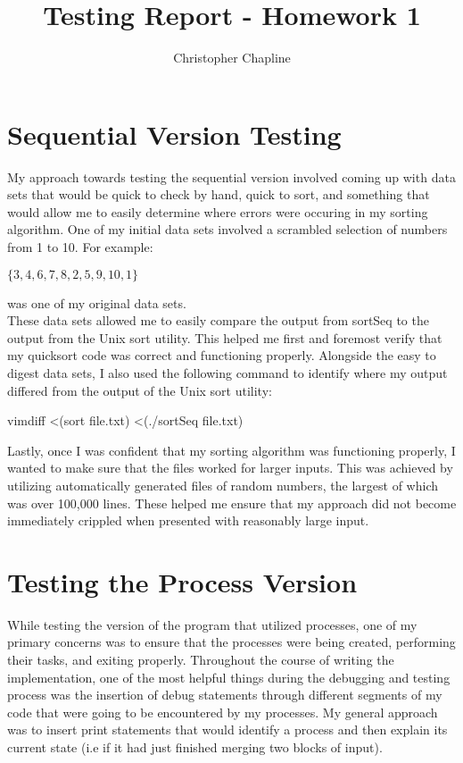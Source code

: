\documentclass{article}%
\begin{document}
\title{Testing Report - Homework 1}
\author{Christopher Chapline}
\maketitle

\section{Sequential Version Testing}

My approach towards testing the sequential version involved coming up with data sets that would be quick to check by hand, quick to sort, and something that would allow me to easily determine where errors were occuring in my sorting algorithm. One of my initial data sets involved a scrambled selection of numbers from 1 to 10. For example:

$\{3, 4, 6, 7, 8, 2, 5, 9, 10, 1\}$

\noindent was one of my original data sets. \\

These data sets allowed me to easily compare the output from sortSeq to the output from the Unix sort utility. This helped me first and foremost verify that my quicksort code was correct and functioning properly. Alongside the easy to digest data sets, I also used the following command to identify where my output differed from the output of the Unix sort utility:

vimdiff \textless (sort file.txt) \textless (./sortSeq file.txt)

\noindent Lastly, once I was confident that my sorting algorithm was functioning properly, I wanted to make sure that the files worked for larger inputs. This was achieved by utilizing automatically generated files of random numbers, the largest of which was over 100,000 lines. These helped me ensure that my approach did not become immediately crippled when presented with reasonably large input.

\section{Testing the Process Version}

While testing the version of the program that utilized processes, one of my primary concerns was to ensure that the processes were being created, performing their tasks, and exiting properly. Throughout the course of writing the implementation, one of the most helpful things during the debugging and testing process was the insertion of debug statements through different segments of my code that were going to be encountered by my processes. My general approach was to insert print statements that would identify a process and then explain its current state (i.e if it had just finished merging two blocks of input).
\end{document}
